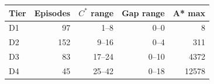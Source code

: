 \begin{tabular}{lrrrr}\toprule
Tier & Episodes & $C^*$ range & Gap range & A* max\\\midrule
D1 & 97 & 1--8 & 0--0 & 8\\
D2 & 152 & 9--16 & 0--4 & 311\\
D3 & 83 & 17--24 & 0--10 & 4372\\
D4 & 45 & 25--42 & 0--18 & 12578\\
\bottomrule\end{tabular}
